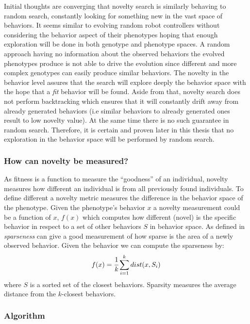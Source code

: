 Initial thoughts are converging that novelty search is similarly behaving to random search, constantly looking for something new in the vast space of behaviors. It seems similar to evolving random robot controllers without considering the behavior aspect of their phenotypes hoping that enough exploration will be done in both genotype and phenotype spaces. A random approach having no information about the observed behaviors the evolved phenotypes produce is not able to drive the evolution since different and more complex genotypes can easily produce similar behaviors. The novelty in the behavior level assures that the search will explore deeply the behavior space with the hope that a \emph{fit} behavior will be found. Aside from that, novelty search does not perform backtracking which ensures that it will constantly drift away from already generated behaviors (i.e similar behaviors to already generated ones result to low novelty value). At the same time there is no such guarantee in random search. Therefore, it is certain and proven later in this thesis that no exploration in the behavior space will be performed by random search.



\subsubsection*{How can novelty be measured?}

As fitness is a function to measure the ``goodness'' of an individual, novelty measures how different an individual is from all previously found individuals. To define different a novelty metric measures the difference in the behavior space of the phenotype. Given the phenotype's behavior $x$ a novelty measurement could be a function of $x$, $f(x)$ which computes how different (novel) is the specific behavior in respect to a set of other behaviors $S$ in behavior space.  As defined in~\citep{lehman2008exploiting,lehman2011abandoning} \emph{sparseness} can give a good measurement of how sparse is the area of a newly observed behavior. Given the behavior we can compute the sparseness by:
\begin{equation}
\label{sparsenessEquation}
f(x) = \cfrac{1}{k} \sum_{i=1}^{k} dist(x, S_i)
\end{equation}
where $S$ is a sorted set of the closest behaviors. Sparsity measures the average distance from the $k$-closest behaviors.


\subsubsection*{Algorithm}

